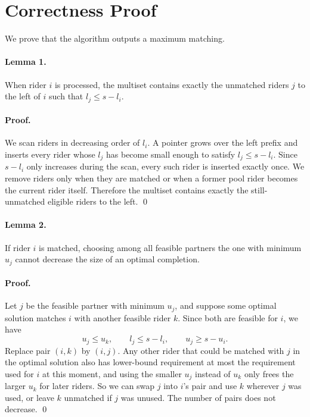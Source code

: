 \documentclass[11pt]{article}
\begin{document}
\section*{Correctness Proof}

We prove that the algorithm outputs a maximum matching.

\paragraph{Lemma 1.}
When rider $i$ is processed, the multiset contains exactly the unmatched riders $j$ to the left of $i$
such that $l_j \le s - l_i$.

\paragraph{Proof.}
We scan riders in decreasing order of $l_i$. A pointer grows over the left prefix and inserts every rider
whose $l_j$ has become small enough to satisfy $l_j \le s - l_i$. Since $s - l_i$ only increases during the
scan, every such rider is inserted exactly once. We remove riders only when they are matched or when a
former pool rider becomes the current rider itself. Therefore the multiset contains exactly the still-unmatched
eligible riders to the left. \qed

\paragraph{Lemma 2.}
If rider $i$ is matched, choosing among all feasible partners the one with minimum $u_j$ cannot decrease
the size of an optimal completion.

\paragraph{Proof.}
Let $j$ be the feasible partner with minimum $u_j$, and suppose some optimal solution matches $i$ with
another feasible rider $k$. Since both are feasible for $i$, we have
\[
u_j \le u_k, \qquad l_j \le s - l_i, \qquad u_j \ge s - u_i.
\]
Replace pair $(i,k)$ by $(i,j)$. Any other rider that could be matched with $j$ in the optimal solution also
has lower-bound requirement at most the requirement used for $i$ at this moment, and using the smaller
$u_j$ instead of $u_k$ only frees the larger $u_k$ for later riders. So we can swap $j$ into $i$'s pair and
use $k$ wherever $j$ was used, or leave $k$ unmatched if $j$ was unused. The number of pairs does not
decrease. \qed
\end{document}
